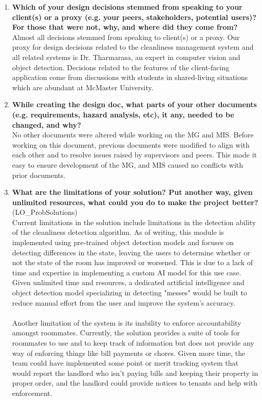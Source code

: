 \documentclass[12pt, titlepage]{article}
\begin{document}
\begin{enumerate}
  \item \textbf{Which of your design decisions stemmed from speaking to your client(s)
  or a proxy (e.g. your peers, stakeholders, potential users)? For those that
  were not, why, and where did they come from?}\\
  Almost all decisions stemmed from speaking to client(s) or a proxy. Our proxy for design decisions related to the cleanliness management system and all related systems is Dr. Tharmarasa, an expert in computer vision and object detection. Decisions related to the features of the client-facing application come from discussions with students in shared-living situations which are abundant at McMaster University.
  \item \textbf{While creating the design doc, what parts of your other documents (e.g.
  requirements, hazard analysis, etc), it any, needed to be changed, and why?}\\
  No other documents were altered while working on the MG and MIS. Before working on this document, previous documents were modified to align with each other and to resolve issues raised by supervisors and peers. This made it easy to ensure development of the MG, and MIS caused no conflicts with prior documents. 
  \item \textbf{What are the limitations of your solution?  Put another way, given
  unlimited resources, what could you do to make the project better?} (LO\_ProbSolutions)\\
  Current limitations in the solution include limitations in the detection ability of the cleanliness detection algorithm. As of writing, this module is implemented using pre-trained object detection models and focuses on detecting differences in the state, leaving the users to determine whether or not the state of the room has improved or worsened. This is due to a lack of time and expertise in implementing a custom AI model for this use case. Given unlimited time and resources, a dedicated artificial intelligence and object detection model specializing in detecting "messes" would be built to reduce manual effort from the user and improve the system's accuracy.\\\\
  Another limitation of the system is its inability to enforce accountability amongst roommates. Currently, the solution provides a suite of tools for roommates to use and to keep track of information but does not provide any way of enforcing things like bill payments or chores. Given more time, the team could have implemented some point or merit tracking system that would report the landlord who isn't paying bills and keeping their property in proper order, and the landlord could provide notices to tenants and help with enforcement.

\end{enumerate}
\end{document}
